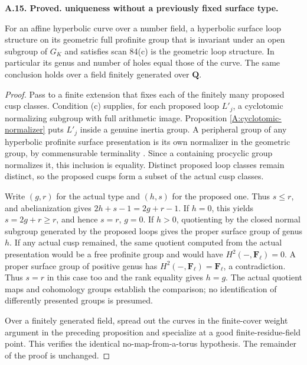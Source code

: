 \documentclass[11pt,oneside]{article}
\makeatletter
\newcounter{statementanchor}
\newenvironment{statement}[3]{%
 \refstepcounter{statementanchor}\def\@currentlabel{#1}%
 \par\addvspace{9pt}\noindent
 \textbf{#1. #2. #3.}\par\nobreak\noindent\ignorespaces
}{\par\addvspace{5pt}}
\makeatother
\begin{document}
\begin{statement}{A.15}{Proved}{uniqueness without a previously fixed surface type}
\label{st:A.15}
\label{A:unique-loops}
For an affine hyperbolic curve over a number field, a
hyperbolic surface loop structure on its geometric full
profinite group that is invariant under an open subgroup
of $G_K$ and satisfies scan 84(c) is the geometric loop
structure.  In particular its genus and number of holes
equal those of the curve.  The same conclusion holds
over a field finitely generated over $\mathbf Q$.
\end{statement}
\begin{proof}
Pass to a finite extension that fixes each of the finitely
many proposed cusp classes.  Condition (c) supplies, for
each proposed loop $L'_j$, a cyclotomic normalizing subgroup
with full arithmetic image.  Proposition
\ref{A:cyclotomic-normalizer} puts $L'_j$ inside a genuine
inertia group.  A peripheral group of any hyperbolic
profinite surface presentation is its own normalizer in
the geometric group, by commensurable terminality
\cite[Lemma 1.3.7]{A_Mochizuki2004}.  Since a containing
procyclic group normalizes it, this inclusion is equality.
Distinct proposed loop classes remain distinct, so the
proposed cusps form a subset of the actual cusp classes.

Write $(g,r)$ for the actual type and $(h,s)$ for the
proposed one.  Thus $s\leq r$, and abelianization gives
$2h+s-1=2g+r-1$.  If $h=0$, this yields
$s=2g+r\geq r$, and hence $s=r$, $g=0$.
If $h>0$, quotienting by the closed normal subgroup
generated by the proposed loops gives the proper
surface group of genus $h$.  If any actual cusp
remained, the same quotient computed from the actual
presentation would be a free profinite group and
would have $H^2(-,\mathbf F_\ell)=0$.  A proper
surface group of positive genus has
$H^2(-,\mathbf F_\ell)=\mathbf F_\ell$, a contradiction.
Thus $s=r$ in this case too and the rank equality gives
$h=g$.  The actual quotient maps and cohomology groups
establish the comparison; no identification of differently
presented groups is presumed.

Over a finitely generated field, spread out the curves
in the finite-cover weight argument in the preceding
proposition and specialize at a good finite-residue-field
point.  This verifies the identical no-map-from-a-torus
hypothesis.  The remainder of the proof is unchanged.
\end{proof}
\end{document}
